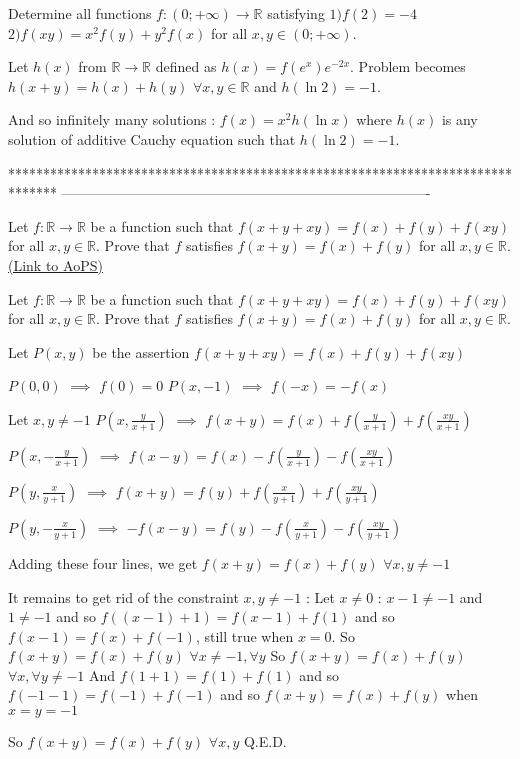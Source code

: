 \begin{solution}
	\begin{tcolorbox}Determine all functions $f:(0;+\infty)\to\mathbb{R}$ satisfying $1)f(2)=-4$
  $2)f(xy)=x^2f(y)+y^2f(x)$ for all $x,y{\in}(0;+\infty)$.\end{tcolorbox}
Let $h(x)$ from $\mathbb R\to\mathbb R$ defined as $h(x)=f(e^{x})e^{-2x}$. Problem becomes $h(x+y)=h(x)+h(y)$ $\forall x,y\in\mathbb R$ and $h(\ln 2)=-1$. 

And so infinitely many solutions : $\boxed{f(x)=x^2h(\ln x)}$ where $h(x)$ is any solution of additive Cauchy equation such that $h(\ln 2)=-1$.
\end{solution}
*******************************************************************************
-------------------------------------------------------------------------------

\begin{problem}
	Let $f:\mathbb{R}\longrightarrow \mathbb{R}$ be a function such that $f(x+y+xy)=f(x)+f(y)+f(xy)$ for all $x, y\in\mathbb{R}$. Prove that $f$ satisfies $f(x+y)=f(x)+f(y)$ for all $x, y\in\mathbb{R}$.
	\flushright \href{https://artofproblemsolving.com/community/c6h489338}{(Link to AoPS)}
\end{problem}



\begin{solution}
	\begin{tcolorbox}Let $f:\mathbb{R}\longrightarrow \mathbb{R}$ be a function such that $f(x+y+xy)=f(x)+f(y)+f(xy)$ for all $x, y\in\mathbb{R}$. Prove that $f$ satisfies $f(x+y)=f(x)+f(y)$ for all $x, y\in\mathbb{R}$.\end{tcolorbox}
Let $P(x,y)$ be the assertion $f(x+y+xy)=f(x)+f(y)+f(xy)$

$P(0,0)$ $\implies$ $f(0)=0$
$P(x,-1)$ $\implies$ $f(-x)=-f(x)$

Let $x,y\ne -1$
$P(x,\frac y{x+1})$ $\implies$ $f(x+y)=f(x)+f(\frac y{x+1})+f(\frac {xy}{x+1})$

$P(x,-\frac y{x+1})$ $\implies$ $f(x-y)=f(x)-f(\frac y{x+1})-f(\frac {xy}{x+1})$

$P(y,\frac x{y+1})$ $\implies$ $f(x+y)=f(y)+f(\frac x{y+1})+f(\frac {xy}{y+1})$

$P(y,-\frac x{y+1})$ $\implies$ $-f(x-y)=f(y)-f(\frac x{y+1})-f(\frac {xy}{y+1})$

Adding these four lines, we get $f(x+y)=f(x)+f(y)$ $\forall x,y\ne -1$

It remains to get rid of the constraint $x,y\ne -1$ :
Let $x\ne 0$ : $x-1\ne -1$ and $1\ne -1$ and so $f((x-1)+1)=f(x-1)+f(1)$ and so $f(x-1)=f(x)+f(-1)$, still true when $x=0$.
So $f(x+y)=f(x)+f(y)$ $\forall x\ne -1,\forall y$
So $f(x+y)=f(x)+f(y)$ $\forall x,\forall y\ne -1$
And $f(1+1)=f(1)+f(1)$ and so $f(-1-1)=f(-1)+f(-1)$ and so $f(x+y)=f(x)+f(y)$ when $x=y=-1$ 


So $f(x+y)=f(x)+f(y)$ $\forall x,y$
Q.E.D.
\end{solution}



